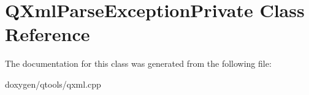 \hypertarget{class_q_xml_parse_exception_private}{}\section{Q\+Xml\+Parse\+Exception\+Private Class Reference}
\label{class_q_xml_parse_exception_private}


The documentation for this class was generated from the following file\+:\begin{DoxyCompactItemize}
\item 
doxygen/qtools/qxml.\+cpp\end{DoxyCompactItemize}
